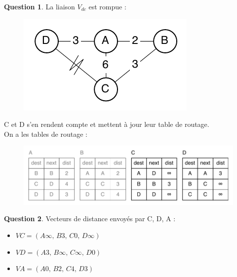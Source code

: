 \documentclass[11pt,english,french]{scrreprt}
\theoremstyle{remark}
\theoremstyle{definition}
\newtheorem{ques}{Question}[section]
\begin{document}
\begin{ques}
	La liaison $V_{dc}$ est rompue : 
	\begin{figure}[h!]
		\center
		\includegraphics[scale=.7]{Exam2009/routeurs1}
	\end{figure}
	
	C et D s'en rendent compte et mettent à jour leur table de routage.\\
	On a les tables de routage : 
	\begin{figure}[h!]
		\center
		\includegraphics[scale=.7]{Exam2009/tables2}
	\end{figure}
\end{ques}

\begin{ques}
	Vecteurs de distance envoyés par C, D, A : \begin{itemize}
		\item $VC = (A\infty,\,B3,\,C0,\,D\infty)$
		\item $VD = (A3,\,B\infty,\,C\infty,\,D0)$
		\item $VA = (A0,\,B2,\,C4,\,D3)$
	\end{itemize}
\end{ques}
\end{document}
